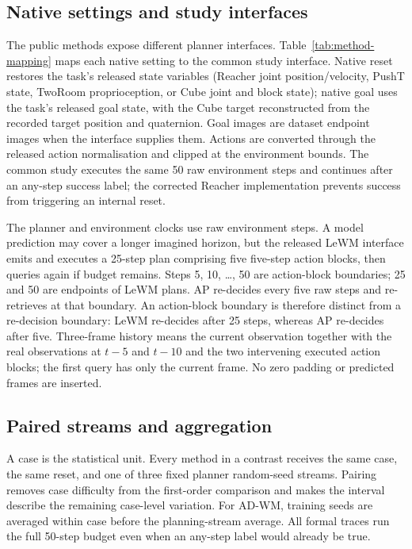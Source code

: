 \documentclass[manuscript,screen,review]{jair}
\begin{document}
\subsection{Native settings and study interfaces}
The public methods expose different planner interfaces. Table~\ref{tab:method-mapping} maps each native setting to the common study interface. Native reset restores the task's released state variables (Reacher joint position/velocity, PushT state, TwoRoom proprioception, or Cube joint and block state); native goal uses the task's released goal state, with the Cube target reconstructed from the recorded target position and quaternion. Goal images are dataset endpoint images when the interface supplies them. Actions are converted through the released action normalisation and clipped at the environment bounds. The common study executes the same 50 raw environment steps and continues after an any-step success label; the corrected Reacher implementation prevents success from triggering an internal reset.


The planner and environment clocks use raw environment steps. A model prediction may cover a longer imagined horizon, but the released LeWM interface emits and executes a 25-step plan comprising five five-step action blocks, then queries again if budget remains. Steps 5, 10, \ldots, 50 are action-block boundaries; 25 and 50 are endpoints of LeWM plans. AP re-decides every five raw steps and re-retrieves at that boundary. An action-block boundary is therefore distinct from a re-decision boundary: LeWM re-decides after 25 steps, whereas AP re-decides after five. Three-frame history means the current observation together with the real observations at $t-5$ and $t-10$ and the two intervening executed action blocks; the first query has only the current frame. No zero padding or predicted frames are inserted.

\subsection{Paired streams and aggregation}
A case is the statistical unit. Every method in a contrast receives the same case, the same reset, and one of three fixed planner random-seed streams. Pairing removes case difficulty from the first-order comparison and makes the interval describe the remaining case-level variation. For AD-WM, training seeds are averaged within case before the planning-stream average. All formal traces run the full 50-step budget even when an any-step label would already be true.
\end{document}
